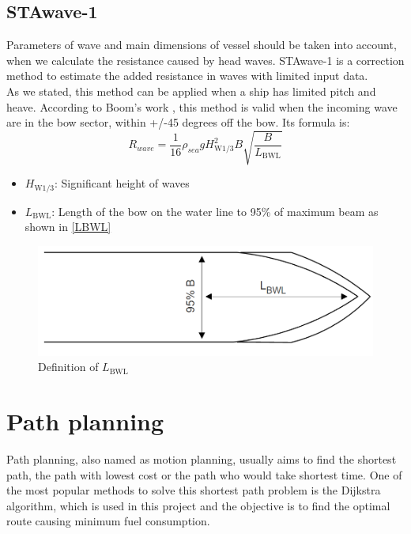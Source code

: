 \subsection{STAwave-1}
\label{sec:STAwave-1}
Parameters of wave and main dimensions of vessel should be taken into account, when we calculate the resistance caused by head waves. STAwave-1 is a correction method to estimate the added resistance in waves with limited input data.
\\As we stated, this method can be applied when a ship has limited pitch and heave. According to Boom's work \cite{van2013new},  this method is valid when the incoming wave are in the bow sector, within +/-45 degrees off the bow. Its formula is:
\begin{equation}
    R_{wave}=\frac{1}{16} \rho_{sea} g H_{\mathrm{W} 1 / 3}^{2} B \sqrt{\frac{B}{L_{\mathrm{BWL}}}}
    \label{STAwave}
\end{equation}
\begin{itemize}
    \item $H_{\mathrm{W} 1 / 3}$: Significant height of waves
    \item $L_{\mathrm{BWL}}$: Length of the bow on the water line to 95\% of maximum beam as shown in \autoref{LBWL}
\end{itemize}
\begin{figure}[H]  
	\centering  
	\includegraphics[width=0.9\linewidth]{definitionofLBWL.png}  
	\caption{Definition of $L_{\mathrm{BWL}}$}  
	\label{LBWL}  
\end{figure}
\section{Path planning}
Path planning, also named as motion planning, usually aims to find the shortest path, the path with lowest cost or the path who would take shortest time. One of the most popular methods to solve this shortest path problem is the Dijkstra algorithm, which is used in this project and the objective is to find the optimal route causing minimum fuel consumption.
